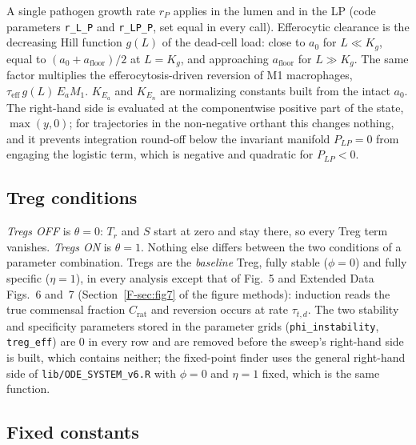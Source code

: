 \documentclass[11pt]{article}
\begin{document}
A single pathogen growth rate $r_P$ applies in the lumen and in the LP (code
parameters \texttt{r\_L\_P} and \texttt{r\_LP\_P}, set equal in every call).
Efferocytic clearance is the decreasing Hill function $g(L)$ of the dead-cell load:
close to $a_0$ for $L \ll K_g$, equal to $(a_0 + a_{\mathrm{floor}})/2$ at $L = K_g$, and
approaching $a_{\mathrm{floor}}$ for $L \gg K_g$. The same factor multiplies the
efferocytosis-driven reversion of M1 macrophages, $\tau_{\mathrm{eff}}\,g(L)\,E_a M_1$.
$K_{E_a}$ and $K_{E_n}$ are normalizing constants built from the intact $a_0$.
The right-hand side is evaluated at the componentwise positive part of the state,
$\max(y, 0)$; for trajectories in the non-negative orthant this changes nothing, and
it prevents integration round-off below the invariant manifold $P_{LP} = 0$ from
engaging the logistic term, which is negative and quadratic for $P_{LP} < 0$.

\subsection{Treg conditions}
\label{sec:treg-conditions}

\emph{Tregs OFF} is $\theta = 0$: $T_r$ and $S$ start at zero and stay there, so
every Treg term vanishes. \emph{Tregs ON} is $\theta = 1$. Nothing
else differs between the two conditions of a parameter combination. Tregs are
the \emph{baseline} Treg, fully stable ($\phi = 0$) and fully specific ($\eta = 1$),
in every analysis except that of Fig.~5 and Extended Data Figs.~6 and~7
(Section~\ref{F-sec:fig7} of the figure methods): induction reads the true commensal fraction $C_{\mathrm{rat}}$
and reversion occurs at rate $\tau_{t,d}$. The two stability and specificity parameters stored in the parameter grids
(\texttt{phi\_instability}, \texttt{treg\_eff}) are 0 in every row and are removed
before the sweep's right-hand side is built, which contains neither; the fixed-point
finder uses the general right-hand side of \texttt{lib/ODE\_SYSTEM\_v6.R} with
$\phi = 0$ and $\eta = 1$ fixed, which is the same function.

\subsection{Fixed constants}
\end{document}
